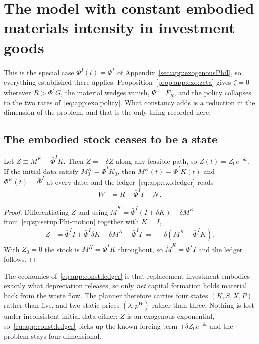 \section{The model with constant embodied materials intensity in investment goods}\label{sec:app:constantPhiI}

This is the special case $\Phi^I\!\left(t\right)=\bar\Phi^I$ of
Appendix~\ref{sec:app:exogenousPhiI}, so everything established there applies:
Proposition~\ref{prop:app:exo:zeta} gives $\zeta=0$ wherever $R>\bar\Phi^IG$, the material wedges
vanish, $\Psi=F_R$, and the policy collapses to the two rates
of~\eqref{eq:app:exo:policy}. What constancy adds is a reduction in the dimension of the problem, and
that is the only thing recorded here.

\subsection{The embodied stock ceases to be a state}\label{sec:app:const:state}

\begin{lemma}[$M^K$ is redundant]\label{lem:app:const:state}
Let $Z\equiv M^K-\bar\Phi^IK$. Then $\dot Z=-\delta Z$ along any feasible path,
so $Z\left(t\right)=Z_0e^{-\delta t}$. If the initial data satisfy $M^K_0=\bar\Phi^IK_0$, then
$M^K\left(t\right)=\bar\Phi^IK\left(t\right)$ and $\Phi^K\left(t\right)=\bar\Phi^I$ at every date, and
the ledger~\eqref{eq:app:exo:ledger} reads
\begin{align}
W &= R-\bar\Phi^II+\mathcal N .
\label{eq:app:const:ledger}
\end{align}
\end{lemma}

\begin{proof}
Differentiating $Z$ and using $\dot M^K=\bar\Phi^I\left(I+\delta K\right)-\delta M^K$
from~\eqref{eq:sp:setup:Phi-motion} together with $\dot K=I$,
\begin{align*}
\dot Z &= \bar\Phi^II+\bar\Phi^I\delta K-\delta M^K-\bar\Phi^II \;=\; -\delta\left(M^K-\bar\Phi^IK\right).
\end{align*}
With $Z_0=0$ the stock is $M^K=\bar\Phi^IK$ throughout, so $\dot M^K=\bar\Phi^II$ and the ledger
follows.
\end{proof}

The economics of~\eqref{eq:app:const:ledger} is that replacement investment embodies exactly what
depreciation releases, so only \emph{net} capital formation holds material back from the waste flow.
The planner therefore carries four states $\left(K,S,X,P\right)$ rather than five, and two static
prices $\left(\lambda,p^W\right)$ rather than three. Nothing is lost under inconsistent initial data
either: $Z$ is an exogenous exponential, so~\eqref{eq:app:const:ledger} picks up the known forcing term
$+\delta Z_0e^{-\delta t}$ and the problem stays four-dimensional.

